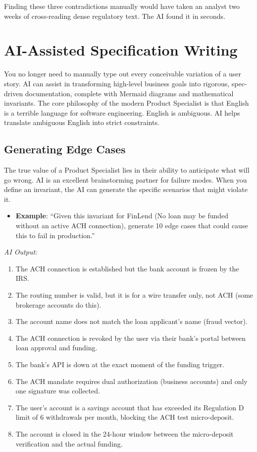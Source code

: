 \documentclass[
  11pt,
  openany,
  oneside]{book}
\providecommand{\tightlist}{%
  \setlength{\itemsep}{0pt}\setlength{\parskip}{0pt}}
\begin{document}
Finding these three contradictions manually would have taken an analyst
two weeks of cross-reading dense regulatory text. The AI found it in
seconds.

\section{AI-Assisted Specification
Writing}\label{ai-assisted-specification-writing}

You no longer need to manually type out every conceivable variation of a
user story. AI can assist in transforming high-level business goals into
rigorous, spec-driven documentation, complete with Mermaid diagrams and
mathematical invariants. The core philosophy of the modern Product
Specialist is that English is a terrible language for software
engineering. English is ambiguous. AI helps translate ambiguous English
into strict constraints.

\subsection{Generating Edge Cases}\label{generating-edge-cases}

The true value of a Product Specialist lies in their ability to
anticipate what will go wrong. AI is an excellent brainstorming partner
for failure modes. When you define an invariant, the AI can generate the
specific scenarios that might violate it.

\begin{itemize}
\tightlist
\item
  \textbf{Example}: ``Given this invariant for FinLend (No loan may be
  funded without an active ACH connection), generate 10 edge cases that
  could cause this to fail in production.''
\end{itemize}

\emph{AI Output:}

\begin{enumerate}
\def\labelenumi{\arabic{enumi}.}
\tightlist
\item
  The ACH connection is established but the bank account is frozen by
  the IRS.
\item
  The routing number is valid, but it is for a wire transfer only, not
  ACH (some brokerage accounts do this).
\item
  The account name does not match the loan applicant's name (fraud
  vector).
\item
  The ACH connection is revoked by the user via their bank's portal
  between loan approval and funding.
\item
  The bank's API is down at the exact moment of the funding trigger.
\item
  The ACH mandate requires dual authorization (business accounts) and
  only one signature was collected.
\item
  The user's account is a savings account that has exceeded its
  Regulation D limit of 6 withdrawals per month, blocking the ACH test
  micro-deposit.
\item
  The account is closed in the 24-hour window between the micro-deposit
  verification and the actual funding.
\end{enumerate}
\end{document}
